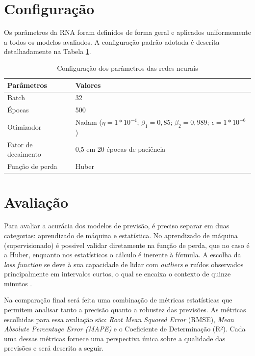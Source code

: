 \section{Configuração} \label{sec:configuracao} 
Os parâmetros da RNA foram definidos de forma geral e aplicados uniformemente a todos os modelos avaliados. A configuração padrão adotada é descrita detalhadamente na Tabela \ref{tabela:parametros}.

\begin{table}[h!]
    \caption{Configuração dos parâmetros das redes neurais} \label{tabela:parametros}
    \begin{tabularx}{\textwidth}{X|X} \hline
    Parâmetros & Valores \\ \hline
    Batch         & 32               \\ \hline
    Épocas         & 500              \\ \hline
    Otimizador               & Nadam ($\eta=1*10^{-4}$; $\beta_1=0{,}85$; $\beta_2=0{,}989$; $\epsilon= 1*10^{-6}$)             \\ \hline
    Fator de decaimento          & 0,5 em 20 épocas de paciência           \\ \hline
    Função de perda          & Huber              \\ \hline
    \end{tabularx}
\end{table}

\section{Avaliação} \label{sec:avaliacao}
Para avaliar a acurácia dos modelos de previsão, é preciso separar em duas categorias: aprendizado de máquina e estatística.
No aprendizado de máquina (supervisionado) é possivel validar diretamente na função de perda, que no caso é a Huber, enquanto nos estatísticos o cálculo é inerente à fórmula.
A escolha da \textit{loss function} se deve à sua capacidade de lidar com \textit{outliers} e ruídos observados principalmente em intervalos curtos, o qual se encaixa o contexto de quinze minutos \cite{Jaiswal}.

Na comparação final será feita uma combinação de métricas estatísticas 
que permitem analisar tanto a precisão quanto a robustez das previsões.
As métricas escolhidas para essa avaliação são: 
\textit{Root Mean Squared Error} (RMSE), \textit{Mean Absolute Percentage Error (MAPE)} e o Coeficiente de Determinação (R²). Cada uma dessas métricas fornece uma perspectiva única sobre a qualidade das previsões e será descrita a seguir.

